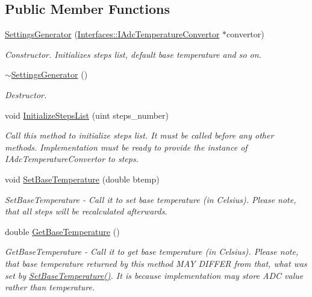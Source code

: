 \subsection*{Public Member Functions}
\begin{DoxyCompactItemize}
\item 
\hyperlink{class_settings_generator_a063e189547011b62a567ff55446341d7}{Settings\+Generator} (\hyperlink{class_interfaces_1_1_i_adc_temperature_convertor}{Interfaces\+::\+I\+Adc\+Temperature\+Convertor} $\ast$convertor)
\begin{DoxyCompactList}\small\item\em Constructor. Initializes steps list, default base temperature and so on. \end{DoxyCompactList}\item 
\mbox{\label{class_settings_generator_aeb8e3d3875929a6869aa93552f30599f}} 
\hyperlink{class_settings_generator_aeb8e3d3875929a6869aa93552f30599f}{$\sim$\+Settings\+Generator} ()
\begin{DoxyCompactList}\small\item\em Destructor. \end{DoxyCompactList}\item 
void \hyperlink{class_settings_generator_a84b81d11cb5f83d4066e73a03acfc143}{Initialize\+Steps\+List} (uint steps\+\_\+number)
\begin{DoxyCompactList}\small\item\em Call this method to initialize steps list. It must be called before any other methods. Implementation must be ready to provide the instance of I\+Adc\+Temperature\+Convertor to steps. \end{DoxyCompactList}\item 
void \hyperlink{class_settings_generator_aed9e7acb30bfd559b1ac70ceeddd8973}{Set\+Base\+Temperature} (double btemp)
\begin{DoxyCompactList}\small\item\em Set\+Base\+Temperature -\/ Call it to set base temperature (in Celsius). Please note, that all steps will be recalculated afterwards. \end{DoxyCompactList}\item 
double \hyperlink{class_settings_generator_a80b1ff8060a16d149989d98a88ab253e}{Get\+Base\+Temperature} ()
\begin{DoxyCompactList}\small\item\em Get\+Base\+Temperature -\/ Call it to get base temperature (in Celsius). Please note, that base temperature returned by this method M\+AY D\+I\+F\+F\+ER from that, what was set by \hyperlink{class_settings_generator_aed9e7acb30bfd559b1ac70ceeddd8973}{Set\+Base\+Temperature()}. It is because implementation may store A\+DC value rather than temperature. \end{DoxyCompactList}\item 

\end{DoxyCompactItemize}
